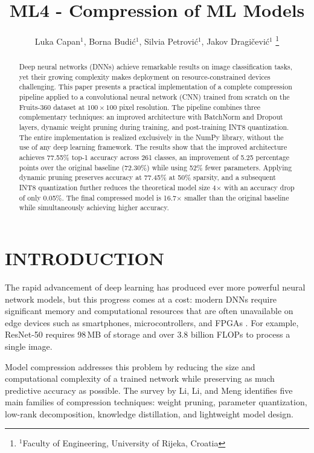 \documentclass[letterpaper, 10 pt, conference]{ieeeconf}
\title{\LARGE \bf
ML4 - Compression of ML Models\\
}
\author{
  \parbox{4in}{\centering
    Luka Capan$^{1}$, Borna Budić$^{1}$, Silvia Petrović$^{1}$, Jakov Dragičević$^{1}$
    \thanks{$^{1}$Faculty of Engineering, University of Rijeka, Croatia}
  }
}
\begin{document}
\maketitle
\thispagestyle{empty}
\pagestyle{empty}

\begin{abstract}
Deep neural networks (DNNs) achieve remarkable results on image classification tasks, yet their growing complexity makes deployment on resource-constrained devices challenging.
This paper presents a practical implementation of a complete compression pipeline applied to a convolutional neural network (CNN) trained from scratch on the Fruits-360 dataset at $100 \times 100$ pixel resolution.
The pipeline combines three complementary techniques: an improved architecture with BatchNorm and Dropout layers, dynamic weight pruning during training, and post-training INT8 quantization.
The entire implementation is realized exclusively in the NumPy library, without the use of any deep learning framework.
The results show that the improved architecture achieves 77.55\% top-1 accuracy across 261 classes, an improvement of 5.25 percentage points over the original baseline (72.30\%) while using 52\% fewer parameters.
Applying dynamic pruning preserves accuracy at 77.45\% at 50\% sparsity, and a subsequent INT8 quantization further reduces the theoretical model size 4$\times$ with an accuracy drop of only 0.05\%.
The final compressed model is 16.7$\times$ smaller than the original baseline while simultaneously achieving higher accuracy.
\end{abstract}

\section{\textbf{INTRODUCTION}}

The rapid advancement of deep learning has produced ever more powerful neural network models, but this progress comes at a cost: modern DNNs require significant memory and computational resources that are often unavailable on edge devices such as smartphones, microcontrollers, and FPGAs \cite{li2023survey}.
For example, ResNet-50 requires 98\,MB of storage and over 3.8 billion FLOPs to process a single image.

Model compression addresses this problem by reducing the size and computational complexity of a trained network while preserving as much predictive accuracy as possible.
The survey by Li, Li, and Meng \cite{li2023survey} identifies five main families of compression techniques: weight pruning, parameter quantization, low-rank decomposition, knowledge distillation, and lightweight model design.
\end{document}
